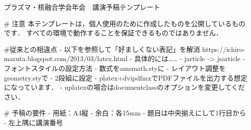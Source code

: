 プラズマ・核融合学会年会　講演予稿テンプレート

# 注意
本テンプレートは，個人使用のために作成したものを公開しているものです．
すべての環境で動作することを保証できるものではありません．

#従来との相違点
- 以下を参照して「好ましくない表記」を解消
  https://ichiro-maruta.blogspot.com/2013/03/latex.html
- 具体的には……
    - jarticle -> jsarticle
    - フォントスタイルの設定方法
    - 数式をamsmath.styに
    - レイアウト調整をgeometry.styで
- 2段組に設定
- platex+dvipdfmxでPDFファイルを出力する想定になっています．
  - uplatexの場合はdocumentclassのオプションを変更してください．

# 予稿の要件
- 用紙：A4縦
- 余白：各15mm
- 題目は中央揃えにして1行目から
- 左上隅に講演番号
